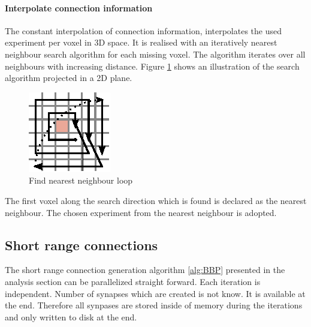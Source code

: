\paragraph{Interpolate connection information}
\label{par:interpolation}

The constant interpolation of connection information, interpolates the used experiment per voxel in 3D space.
It is realised with an iteratively nearest neighbour search algorithm for each missing voxel.
The algorithm iterates over all neighbours with increasing distance.
Figure \ref{longrange} shows an illustration of the search algorithm
projected in a 2D plane.
\begin{figure}[ht!]
\centering
\includegraphics[scale=2.5]{pictures/longRange_Nearest_parallelAlg.eps}
\caption{Find nearest neighbour loop}
\label{longrange}
\end{figure}
The first voxel along the search direction which is found is declared as the nearest neighbour.
The chosen experiment from the nearest neighbour is adopted.



\subsection{Short range connections}

The short range connection generation algorithm \ref{alg:BBP} presented in the analysis section can be parallelized straight forward.
Each iteration is independent. Number of synapses which are created is not know. It is available
at the end. Therefore all synpases are stored inside of memory during the iterations and only written to disk 
at the end.

